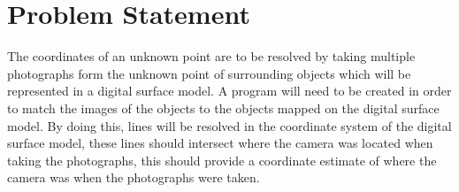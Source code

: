 

\section{Problem Statement}
The coordinates of an unknown point are to be resolved by taking multiple photographs form the unknown point of surrounding objects which will be represented in a digital surface model. A program will need to be created in order to match the images of the objects to the objects mapped on the digital surface model. By doing this, lines will be resolved in the coordinate system of the digital surface model, these lines should intersect where the camera was located when taking the photographs, this should provide a coordinate estimate of where the camera was when the photographs were taken.